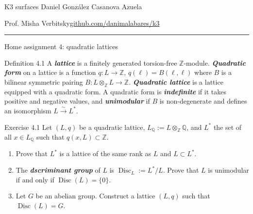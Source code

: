 

\usepackage[style=authortitle-terse,backend=bibtex]{biblatex}


\setcounter{secnumdepth}{0}



\begin{minipage}{\textwidth}
	\begin{minipage}{1\textwidth}
		K3 surfaces \hfill Daniel González Casanova Azuela
		
		{\small Prof. Misha Verbitsky\hfill\href{https://github.com/danimalabares/k3}{github.com/danimalabares/k3}}
	\end{minipage}
\end{minipage}\vspace{.2cm}\hrule

\vspace{10pt}
{\huge Home assignment 4: quadratic lattices}

\begin{idea5}{Definition 4.1}\leavevmode
	A \textit{\textbf{lattice}} is a finitely generated torsion-free $\mathbb{Z}$-module. \textit{\textbf{Quadratic form}} on a lattice is a function $q:L\to \mathbb{Z}$, $q(\ell)=B(\ell,\ell)$ where $B$ is a bilinear symmetric pairing $B:L\otimes_\mathbb{Z}L\longrightarrow \mathbb{Z}$. \textit{\textbf{Quadratic lattice}} is a lattice equipped with a quadratic form. A quadratic form is \textit{\textbf{indefinite}} if it takes positive and negative values, and \textit{\textbf{unimodular}} if $B$ is non-degenerate and defines an isomorphism $L\xrightarrow{\sim}L^*$.
\end{idea5}

\begin{idea4}{Exercise 4.1}\leavevmode
	Let $(L,q)$ be a quadratic lattice, $L_{\mathbb{Q}}:=L\otimes_{\mathbb{Z}}\mathbb{Q}$, and $L^*$ the set of all $x\in L_{\mathbb{Q}}$ such that $q(x,L)\subset \mathbb{Z}$.
	\begin{enumerate}[label=\alph*.]
		\item Prove that $L^*$ is a lattice of the same rank as $L$ and $L\subset L^*$.
		\item The \textit{\textbf{dscriminant group}} of $L$ is $\operatorname{Disc}_L:=L^*/L$. Prove that $L$ is unimodular if and only if $\operatorname{Disc}(L)=\{0\}$.
		\item Let $G$ be an abelian group. Construct a lattice $(L,q)$ such that $\operatorname{Disc}(L)=G$.
	\end{enumerate}
\end{idea4}

